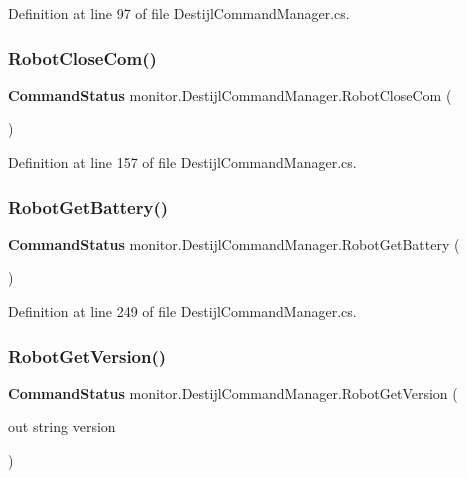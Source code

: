 Definition at line 97 of file Destijl\+Command\+Manager.\+cs.

\mbox{\label{classmonitor_1_1_destijl_command_manager_a0139bec493c965670226381f2ba63a23}} 
\subsubsection{Robot\+Close\+Com()}
{\footnotesize\ttfamily \textbf{ Command\+Status} monitor.\+Destijl\+Command\+Manager.\+Robot\+Close\+Com (\begin{DoxyParamCaption}{ }\end{DoxyParamCaption})}



Definition at line 157 of file Destijl\+Command\+Manager.\+cs.

\mbox{\label{classmonitor_1_1_destijl_command_manager_a2ec8021340de939318ace65b8462b930}} 
\subsubsection{Robot\+Get\+Battery()}
{\footnotesize\ttfamily \textbf{ Command\+Status} monitor.\+Destijl\+Command\+Manager.\+Robot\+Get\+Battery (\begin{DoxyParamCaption}{ }\end{DoxyParamCaption})}



Definition at line 249 of file Destijl\+Command\+Manager.\+cs.

\mbox{\label{classmonitor_1_1_destijl_command_manager_a7ddd552ed82382a09b4af075c34fb989}} 
\subsubsection{Robot\+Get\+Version()}
{\footnotesize\ttfamily \textbf{ Command\+Status} monitor.\+Destijl\+Command\+Manager.\+Robot\+Get\+Version (\begin{DoxyParamCaption}\item[{out string}]{version }\end{DoxyParamCaption})}



